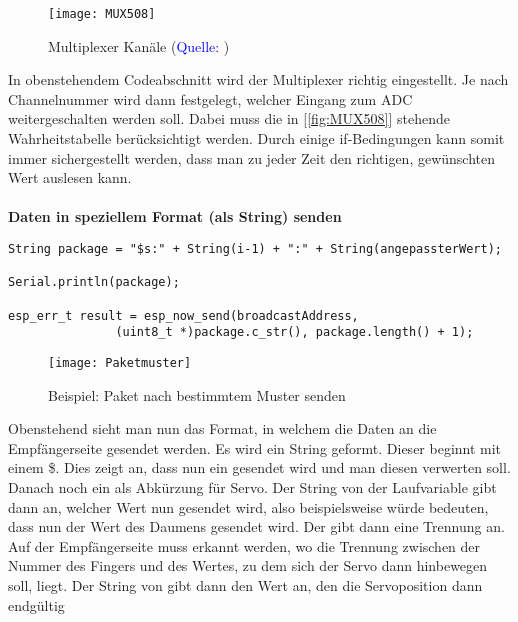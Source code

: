 \documentclass[titlepage,12pt,twoside]{article}
\begin{document}
\hfill \break
\normalsize
\begin{figure}[H]
	\begin{center}
		\scalebox{1.1}
		{\texttt{[image: MUX508]}}
		\caption{Multiplexer Kanäle (\textcolor{blue}{Quelle: \cite{TexasInstruments}})}
		\label{fig:MUX508}			
	\end{center}
\end{figure}
\hfill \break
In obenstehendem Codeabschnitt wird der Multiplexer richtig eingestellt. Je nach 
Channelnummer wird dann festgelegt, welcher Eingang zum ADC weitergeschalten werden 
soll. Dabei muss die in [\textcolor{blue}{\autoref{fig:MUX508}}] stehende Wahrheitstabelle berücksichtigt werden. 
Durch einige if-Bedingungen kann somit immer sichergestellt werden, dass man 
zu jeder Zeit den richtigen, gewünschten Wert auslesen kann. \\
\\
\textbf{Daten in speziellem Format (als String) senden} \\
\footnotesize
\begin{lstlisting}
String package = "$s:" + String(i-1) + ":" + String(angepassterWert);

Serial.println(package);

esp_err_t result = esp_now_send(broadcastAddress, 
        	   (uint8_t *)package.c_str(), package.length() + 1);
\end{lstlisting}
\hfill \break
\normalsize
\begin{figure}[H]
	\begin{center}
		\scalebox{1.1}
		{\texttt{[image: Paketmuster]}}
		\caption{Beispiel: Paket nach bestimmtem Muster senden}
		\label{fig:Paketmuster}			
	\end{center}
\end{figure}
\hfill \break
Obenstehend sieht man nun das Format, in welchem die Daten an die Empfängerseite 
gesendet werden. Es wird ein String geformt. Dieser beginnt mit einem \$. Dies zeigt 
an, dass nun ein  gesendet wird und man diesen verwerten soll. Danach noch 
ein  als Abkürzung für Servo. Der String von der Laufvariable  gibt dann an, 
welcher Wert nun gesendet wird, also beispielsweise  würde bedeuten, dass nun 
der Wert des Daumens gesendet wird. Der gibt dann eine Trennung an. Auf der 
Empfängerseite muss erkannt werden, wo die Trennung zwischen der Nummer des Fingers 
und des Wertes, zu dem sich der Servo dann hinbewegen soll, liegt. Der String von 
 gibt dann den Wert an, den die Servoposition dann endgültig 
\end{document}
